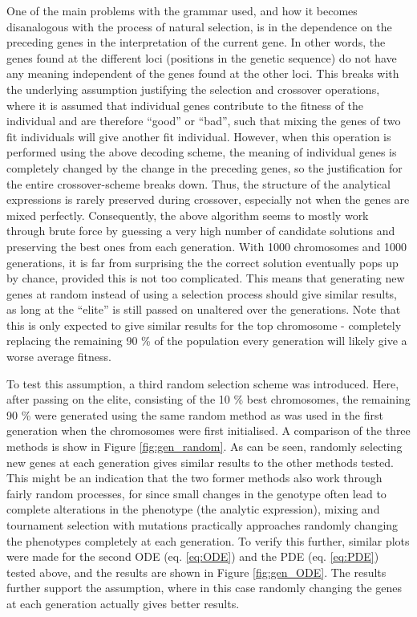 \documentclass[multicolumn, 9pt]{extarticle}
\begin{document}
One of the main problems with the grammar used, and how it becomes disanalogous with the process of natural selection, is in the dependence on the preceding genes in the interpretation of the current gene. In other words, the genes found at the different loci (positions in the genetic sequence) do not have any meaning independent of the genes found at the other loci. This breaks with the underlying assumption justifying the selection and crossover operations, where it is assumed that individual genes contribute to the fitness of the individual and are therefore ``good'' or ``bad'', such that mixing the genes of two fit individuals will give another fit individual. However, when this operation is performed using the above decoding scheme, the meaning of individual genes is completely changed by the change in the preceding genes, so the justification for the entire crossover-scheme breaks down. Thus, the structure of the analytical expressions is rarely preserved during crossover, especially not when the genes are mixed perfectly. Consequently, the above algorithm seems to mostly work through brute force by guessing a very high number of candidate solutions and preserving the best ones from each generation. With 1000 chromosomes and 1000 generations, it is far from surprising the the correct solution eventually pops up by chance, provided this is not too complicated. This means that generating new genes at random instead of using a selection process should give similar results, as long at the ``elite'' is still passed on unaltered over the generations. Note that this is only expected to give similar results for the top chromosome - completely replacing the remaining 90 \% of the population every generation will likely give a worse average fitness. 

To test this assumption, a third random selection scheme was introduced. Here, after passing on the elite, consisting of the 10 \% best chromosomes, the remaining 90 \% were generated using the same random method as was used in the first generation when the chromosomes were first initialised. A comparison of the three methods is show in Figure \ref{fig:gen_random}. As can be seen, randomly selecting new genes at each generation gives similar results to the other methods tested. This might be an indication that the two former methods also work through fairly random processes, for since small changes in the genotype often lead to complete alterations in the phenotype (the analytic expression), mixing and tournament selection with mutations practically approaches randomly changing the phenotypes completely at each generation. To verify this further, similar plots were made for the second ODE (eq. \eqref{eq:ODE}) and the PDE (eq. \eqref{eq:PDE}) tested above, and the results are shown in Figure \ref{fig:gen_ODE}. The results further support the assumption, where in this case randomly changing the genes at each generation actually gives better results. 
\end{document}

